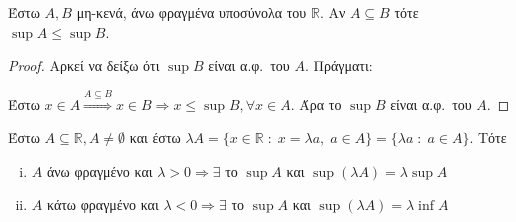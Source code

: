 \documentclass[main.tex]{subfiles}
\begin{document}
\begin{mypropbox}
  \label{prop:leqsup}
  Έστω $ A, B $ μη-κενά, άνω φραγμένα υποσύνολα του $ \mathbb{R} $. Αν $ A \subseteq 
B$ τότε $ \sup A \leq \sup B $.
\end{mypropbox}
\begin{proof}
\item {}
  Αρκεί να δείξω ότι $ \sup B $ είναι α.φ.\ του $A$. Πράγματι:

  Έστω $ x \in A \overset{A \subseteq B}{\Rightarrow } x \in B \Rightarrow 
  x \leq \sup B, \forall x \in A$. Άρα το $ \sup B $ είναι α.φ.\ του $A$.
\end{proof}

\begin{mypropbox}
Έστω $ A \subseteq \mathbb{R}, A \neq \emptyset $ και έστω $ \lambda A = 
  \{ x \in \mathbb{R} \; : \; x = \lambda a, \; a \in A \} = \{ \lambda a \; : \; 
  a \in A\} $. Τότε
  \begin{enumerate}[(i)]
    \item $ A $ άνω φραγμένο και $ \lambda >0 \Rightarrow \exists $ το $ \sup A $
      και $ \sup (\lambda A) = \lambda \sup A $
    \item $ A $ κάτω φραγμένο και $ \lambda <0 \Rightarrow \exists $ το $ \sup A $
      και $ \sup (\lambda A) = \lambda \inf A $
  \end{enumerate}
\end{mypropbox}
\end{document}
